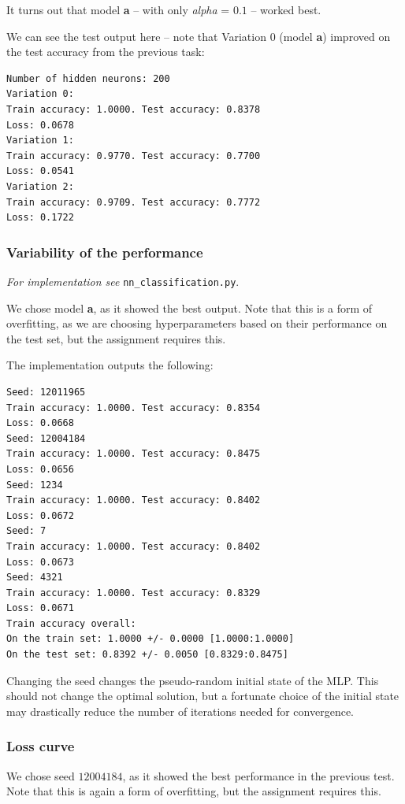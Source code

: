     It turns out that model \textbf{a} -- with only \textit{alpha} = $0.1$ -- worked best.

    \pagebreak
    We can see the test output here -- note that Variation 0 (model \textbf{a}) improved on the test accuracy from the previous task:

    \begin{lstlisting}
Number of hidden neurons: 200
Variation 0:
Train accuracy: 1.0000. Test accuracy: 0.8378
Loss: 0.0678
Variation 1:
Train accuracy: 0.9770. Test accuracy: 0.7700
Loss: 0.0541
Variation 2:
Train accuracy: 0.9709. Test accuracy: 0.7772
Loss: 0.1722
    \end{lstlisting}

    \subsubsection{Variability of the performance}
    \textit{For implementation see } \texttt{nn\_classification.py}.

    We chose model \textbf{a}, as it showed the best output.
    Note that this is a form of overfitting, as we are choosing hyperparameters based on their performance on the test set,
    but the assignment requires this.

    The implementation outputs the following:
    \begin{lstlisting}
Seed: 12011965
Train accuracy: 1.0000. Test accuracy: 0.8354
Loss: 0.0668
Seed: 12004184
Train accuracy: 1.0000. Test accuracy: 0.8475
Loss: 0.0656
Seed: 1234
Train accuracy: 1.0000. Test accuracy: 0.8402
Loss: 0.0672
Seed: 7
Train accuracy: 1.0000. Test accuracy: 0.8402
Loss: 0.0673
Seed: 4321
Train accuracy: 1.0000. Test accuracy: 0.8329
Loss: 0.0671
Train accuracy overall:
On the train set: 1.0000 +/- 0.0000 [1.0000:1.0000]
On the test set: 0.8392 +/- 0.0050 [0.8329:0.8475]
    \end{lstlisting}

    Changing the seed changes the pseudo-random initial state of the MLP.
    This should not change the optimal solution,
    but a fortunate choice of the initial state may drastically reduce the number of iterations needed for convergence.

    \subsubsection{Loss curve}
    We chose seed $12004184$, as it showed the best performance in the previous test.
    Note that this is again a form of overfitting, but the assignment requires this.

